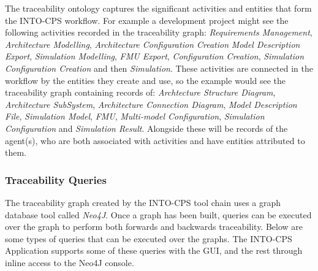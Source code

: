 
The traceability ontology captures the significant activities and entities that form the INTO-CPS workflow.  For example a development project might see the following activities recorded in the traceability graph:  \emph{Requirements Management}, \emph{Architecture Modelling}, \emph{Architecture Configuration Creation} \emph{Model Description Export}, \emph{Simulation Modelling}, \emph{FMU Export}, \emph{Configuration Creation}, \emph{Simulation Configuration Creation} and then \emph{Simulation}.  These activities are connected in the workflow by the entities they create and use, so the example would see the traceability graph containing records of: \emph{Archtecture Structure Diagram}, \emph{Architecture SubSystem}, \emph{Architecture Connection Diagram}, \emph{Model Description File}, \emph{Simulation Model}, \emph{FMU}, \emph{Multi-model Configuration}, \emph{Simulation Configuration} and \emph{Simulation Result}.  Alongside these will be records of the agent(s), who are both associated with activities and have entities attributed to them.



\subsubsection{Traceability Queries}


The traceability graph created by the INTO-CPS tool chain uses a graph database tool called \emph{Neo4J}. Once a graph has been built, queries can be executed over the graph to perform both forwards and backwards traceability. Below are some types of queries that can be executed over the graphs. The INTO-CPS Application supports some of these queries with the GUI, and the rest through inline access to the Neo4J console.


